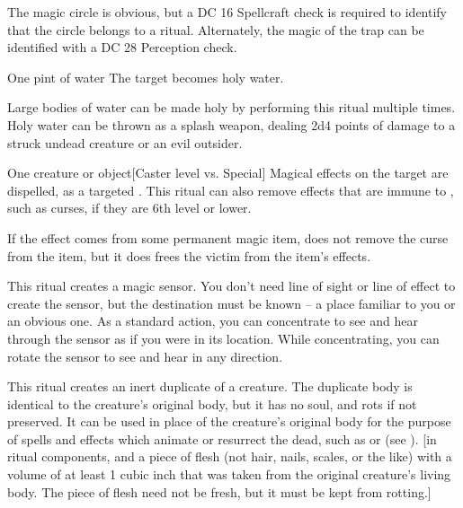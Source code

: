 The magic circle is obvious, but a DC 16 Spellcraft check is required to identify that the circle belongs to a  ritual. Alternately, the magic of the trap can be identified with a DC 28 Perception check.

\begin{spelltarget}{One pint of water}
    \spelleffect The target becomes holy water.
\end{spelltarget}
\spellnotes Large bodies of water can be made holy by performing this ritual multiple times. Holy water can be thrown as a splash weapon, dealing 2d4 points of damage to a struck undead creature or an evil outsider.

\spellrng{\rngclose}
\begin{spelltarget}{One creature or object}[Caster level vs. Special]
    \spelleffect Magical effects on the target are dispelled, as a targeted . This ritual can also remove effects that are immune to , such as curses, if they are 6th level or lower.
\end{spelltarget}
\par If the effect comes from some permanent magic item,  does not remove the curse from the item, but it does frees the victim from the item's effects.

\spellrng{\rngext \rngunrestricted}
\spelldur{\durmed \dismissable}
\spellline
\spelleffect This ritual creates a magic sensor. You don't need line of sight or line of effect to create the sensor, but the destination must be known -- a place familiar to you or an obvious one. As a standard action, you can concentrate to see and hear through the sensor as if you were in its location. While concentrating, you can rotate the sensor to see and hear in any direction.
\spellnotes \sensorspellnotes
{}

\spelleffect This ritual creates an inert duplicate of a creature. The duplicate body is identical to the creature's original body, but it has no soul, and rots if not preserved. It can be used in place of the creature's original body for the purpose of spells and effects which animate or resurrect the dead, such as  or  (see ).
[in ritual components, and a piece of flesh (not hair, nails, scales, or the like) with a volume of at least 1 cubic inch that was taken from the original creature's living body. The piece of flesh need not be fresh, but it must be kept from rotting.]

